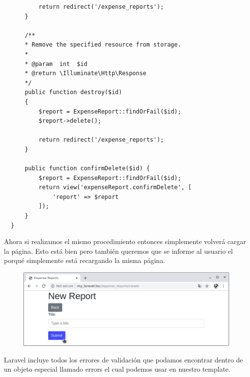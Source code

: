 \documentclass{article}
\begin{document}
\begin{verbatim}
          return redirect('/expense_reports');
      }

      /**
      * Remove the specified resource from storage.
      *
      * @param  int  $id
      * @return \Illuminate\Http\Response
      */
      public function destroy($id)
      {
          $report = ExpenseReport::findOrFail($id);
          $report->delete();

          return redirect('/expense_reports');
      }

      public function confirmDelete($id) {
          $report = ExpenseReport::findOrFail($id);
          return view('expenseReport.confirmDelete', [
              'report' => $report
          ]);
      }
  }
\end{verbatim}

Ahora si realizamos el mismo procedimiento entonces simplemente volverá cargar
la página. Esto está bien pero también queremos que se informe al usuario el
porqué simplemente está recargando la misma página.\\

\newpage

\begin{figure}[h!]
  \centering
  \includegraphics[scale=0.5]{./Pictures/088_validate_without_message.png}
\end{figure}

Laravel incluye todos los errores de validación que podamos encontrar dentro de
un objeto especial llamado errors el cual podemos usar en nuestro template.\\
\end{document}
